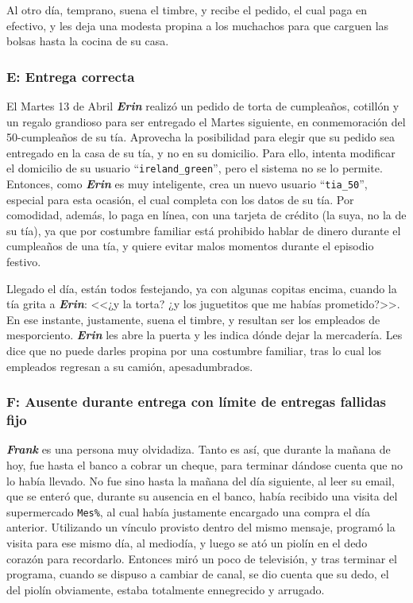 Al otro día, temprano, suena el timbre, y recibe el pedido, el cual paga en
efectivo, y les deja una modesta propina a los muchachos para que carguen las
bolsas hasta la cocina de su casa.

\subsubsection{E: Entrega correcta}

El Martes 13 de Abril \textbf{\emph{Erin}} realizó un pedido de torta de
cumpleaños, cotillón y un regalo grandioso para ser entregado el Martes
siguiente, en conmemoración del 50-cumpleaños de su tía. Aprovecha la
posibilidad para elegir que su pedido sea entregado en la casa de su tía, y no
en su domicilio. Para ello, intenta modificar el domicilio de su usuario
``\texttt{ireland\_green}'', pero el sistema no se lo permite. Entonces, como
\textbf{\emph{Erin}} es muy inteligente, crea un nuevo usuario
``\texttt{tia\_50}'', especial para esta ocasión, el cual completa con los
datos de su tía. Por comodidad, además, lo paga en línea, con una tarjeta de
crédito (la suya, no la de su tía), ya que por costumbre familiar está
prohibido hablar de dinero durante el cumpleaños de una tía, y quiere evitar
malos momentos durante el episodio festivo.

Llegado el día, están todos festejando, ya con algunas copitas encima, cuando
la tía grita a \textbf{\emph{Erin}}: <<¿y la torta? ¿y los juguetitos que me
habías prometido?>>. En ese instante, justamente, suena el timbre, y resultan
ser los empleados de mesporciento. \textbf{\emph{Erin}} les abre la puerta y
les indica dónde dejar la mercadería. Les dice que no puede darles propina por
una costumbre familiar, tras lo cual los empleados regresan a su camión,
apesadumbrados.

\subsubsection{F: Ausente durante entrega con límite de entregas fallidas fijo}

\textbf{\emph{Frank}} es una persona muy olvidadiza. Tanto es así, que durante
la mañana de hoy, fue hasta el banco a cobrar un cheque, para terminar dándose
cuenta que no lo había llevado. No fue sino hasta la mañana del día siguiente,
al leer su email, que se enteró que, durante su ausencia en el banco, había
recibido una visita del supermercado \texttt{Mes\%}, al cual había justamente
encargado una compra el día anterior. Utilizando un vínculo provisto dentro
del mismo mensaje, programó la visita para ese mismo día, al mediodía, y luego
se ató un piolín en el dedo corazón para recordarlo. Entonces miró un poco de
televisión, y tras terminar el programa, cuando se dispuso a cambiar de canal,
se dio cuenta que su dedo, el del piolín obviamente, estaba totalmente
ennegrecido y arrugado.

